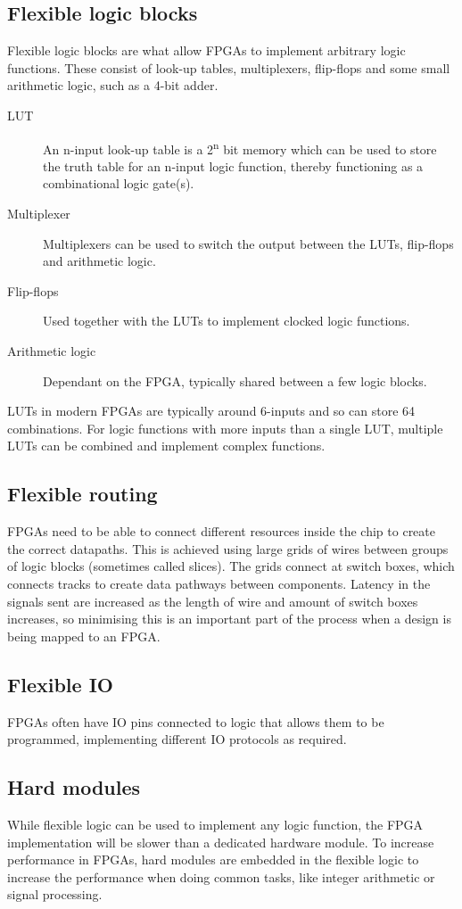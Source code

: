 \subsection{Flexible logic blocks}
Flexible logic blocks are what allow FPGAs to implement arbitrary logic functions. These consist of look-up tables, multiplexers, flip-flops and some small arithmetic logic, such as a 4-bit adder.

\begin{description}
    \item[LUT] An n-input look-up table is a 2\textsuperscript{n} bit memory which can be used to store the truth table for an n-input logic function, thereby functioning as a combinational logic gate(s).
    \item[Multiplexer] Multiplexers can be used to switch the output between the LUTs, flip-flops and arithmetic logic.
    \item[Flip-flops] Used together with the LUTs to implement clocked logic functions.
    \item[Arithmetic logic] Dependant on the FPGA, typically shared between a few logic blocks.
\end{description}

LUTs in modern FPGAs are typically around 6-inputs and so can store 64 combinations. For logic functions with more inputs than a single LUT, multiple LUTs can be combined and implement complex functions.

\subsection{Flexible routing}
FPGAs need to be able to connect different resources inside the chip to create the correct datapaths. This is achieved using large grids of wires between groups of logic blocks (sometimes called slices). The grids connect at switch boxes, which connects tracks to create data pathways between components. Latency in the signals sent are increased as the length of wire and amount of switch boxes increases, so minimising this is an important part of the process when a design is being mapped to an FPGA.

\subsection{Flexible IO}
FPGAs often have IO pins connected to logic that allows them to be programmed, implementing different IO protocols as required.

\subsection{Hard modules}
While flexible logic can be used to implement any logic function, the FPGA implementation will be slower than a dedicated hardware module. To increase performance in FPGAs, hard modules are embedded in the flexible logic to increase the performance when doing common tasks, like integer arithmetic or signal processing. 

